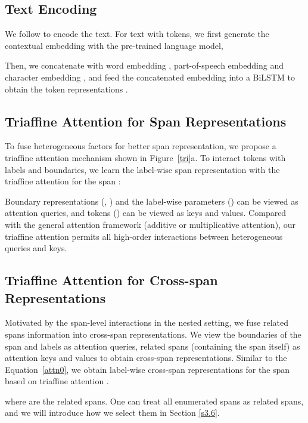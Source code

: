 \documentclass[11pt]{article}
\begin{document}
\subsection{Text Encoding}

We follow \citet{ju-etal-2018-neural,shen2021locate,tan2021sequence} to encode the text. For text  with  tokens, we first generate the contextual embedding  with the pre-trained language model,

Then, we concatenate  with word embedding , part-of-speech embedding  and character embedding , and feed the concatenated embedding  into a BiLSTM \cite{hochreiter1997long} to obtain the token representations .

\subsection{Triaffine Attention for Span Representations} \label{triaffine}

To fuse heterogeneous factors for better span representation, we propose a triaffine attention mechanism shown in Figure~\ref{tri}a. 
To interact tokens with labels and boundaries, we learn the label-wise span representation  with the triaffine attention  for the span :

Boundary representations (, ) and the label-wise parameters () can be viewed as attention queries, and tokens () can be viewed as keys and values.
Compared with the general attention framework (additive or multiplicative attention), our triaffine attention permits all high-order interactions between heterogeneous queries and keys.










\subsection{Triaffine Attention for Cross-span Representations}
Motivated by the span-level interactions in the nested setting,
we fuse related spans information 
into cross-span representations.
We view the boundaries of the span and labels as attention queries, related spans (containing the span itself) as attention keys and values to obtain cross-span representations.
Similar to the Equation~\ref{attn0}, we obtain label-wise cross-span representations  for the span  based on triaffine attention .

where  are the related spans. One can treat all enumerated spans as related spans, and we will introduce how we select them in Section \ref{s3.6}.
\end{document}
